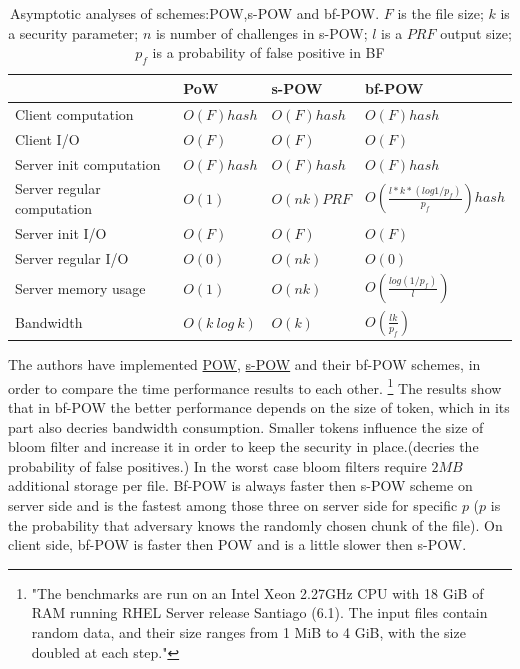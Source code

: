 \documentclass[12pt]{article}
\begin{document}
\begin{savenotes}
\begin{table}[!htpb]
\centering
\addtolength{\tabcolsep}{3pt}
\begin{tabular}{|L{5cm}|L{2.5cm}|L{2.5cm}|L{3.5cm}|}
\hline
&PoW&s-POW&bf-POW\\
\hline
Client computation&$O(F)hash$ & $O(F)hash$ & $O(F)hash$ \\
\hline
Client I/O&$O(F)$&$O(F)$&$O(F)$\\
\hline
Server init computation &$O(F) hash$&$O(F) hash$&$O(F)hash$\\
\hline
Server regular computation &$O(1)$&$O(nk) PRF$& $O(\frac{l*k*(log1/p_f)}{p_f})hash$\\
\hline
Server init I/O &$O(F)$&$O(F)$&$O(F)$\\
\hline
Server regular I/O &$O(0)$&$O(nk)$&$O(0)$\\
\hline
Server memory usage&$O(1)$&$O(nk)$&$O(\frac{log(1/p_f)}{l})$\\
\hline
Bandwidth&$O(k\ log\ k)$&$O(k)$&$O(\frac{lk}{p_f})$\\
\hline

\end{tabular}
\caption{Asymptotic analyses of schemes:POW,s-POW and bf-POW. $F$ is the file size; $k$ is a security parameter; $n$ is number of challenges in s-POW;  $l$ is a $PRF$ output size; $p_f$ is a probability of false positive in BF \cite{BF}}
\label{table:asymptoticAnalysisBF-POW}
\end{table}
\end{savenotes}
 
The authors have implemented \hyperref[sub:Soltuion1]{POW}, \hyperref[sub:Soltuion2]{s-POW} and their bf-POW schemes, in order to compare the time performance results to each other. \footnote{"The benchmarks are run on an Intel Xeon 2.27GHz CPU with 18 GiB of RAM running RHEL Server release Santiago (6.1). The input files contain random data, and their size ranges from 1 MiB to 4 GiB, with the size doubled at each step."} The results show that in bf-POW the better performance  depends on the size of token, which in its part also decries bandwidth consumption. Smaller tokens influence the size of bloom filter and increase it in order to keep the security in place.(decries the probability of false positives.)  In the worst case bloom filters require  $2MB$ additional storage per file. Bf-POW is always faster then s-POW scheme on server side and is the fastest  among those three on server side for specific $p$ ($p$ is the probability that adversary knows the randomly chosen chunk of the file). On client side, bf-POW is faster then POW and is a little slower then s-POW.
 
\end{document}
